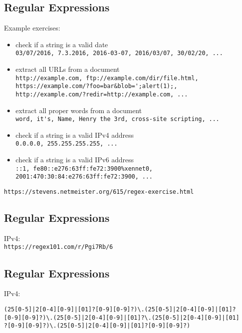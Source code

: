 \documentclass[xga]{xdvislides}
\begin{document}
\subsection{Regular Expressions}
Example exercises:
\begin{itemize}
	\item check if a string is a valid date \\
		\verb+03/07/2016, 7.3.2016, 2016-03-07, 2016/03/07, 30/02/20, ...+
	\item extract all URLs from a document \\
		\verb+http://example.com, ftp://example.com/dir/file.html,+ \\
		\verb+https://example.com/?foo=bar&blob=';alert(1);,+ \\
		\verb+http://example.com/?redir=http://example.com, ...+
	\item extract all proper words from a document \\
		\verb+word, it's, Name, Henry the 3rd, cross-site scripting, ...+
	\item check if a string is a valid IPv4 address \\
		\verb+0.0.0.0, 255.255.255.255, ...+
	\item check if a string is a valid IPv6 address \\
		\verb+::1, fe80::e276:63ff:fe72:3900%xennet0, 2001:470:30:84:e276:63ff:fe72:3900, ...+
\end{itemize}
\vspace{.25in}
\verb+https://stevens.netmeister.org/615/regex-exercise.html+

\subsection{Regular Expressions}
IPv4: \\

\vspace{.5in}
\verb+https://regex101.com/r/Pgi7Rb/6+

\subsection{Regular Expressions}
IPv4:
\begin{verbatim}
(25[0-5]|2[0-4][0-9]|[01]?[0-9][0-9]?)\.(25[0-5]|2[0-4][0-9]|[01]?
[0-9][0-9]?)\.(25[0-5]|2[0-4][0-9]|[01]?\.(25[0-5]|2[0-4][0-9]|[01]
?[0-9][0-9]?)\.(25[0-5]|2[0-4][0-9]|[01]?[0-9][0-9]?)
\end{verbatim}
\end{document}

